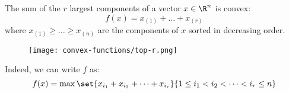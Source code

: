 \begin{example}
    The sum of the $r$ largest components of a vector $x\in\R^n$ is convex:
    \begin{equation*}
        f(x) = x_{(1)} + \dots + x_{(r)}
    \end{equation*}
    where $x_{(1)}\geq\dots\geq x_{(n)}$ are the components of $x$ sorted in decreasing order.
    \begin{figure}[H]
        \centering
        \texttt{[image: convex-functions/top-r.png]}
    \end{figure}
    Indeed, we can write $f$ as:
    \begin{equation*}
        f(x) = \max\set{x_{i_1} + x_{i_2} + \dots + x_{i_r}}{1\leq i_1<i_2<\dots<i_r\leq n}
    \end{equation*}
\end{example}